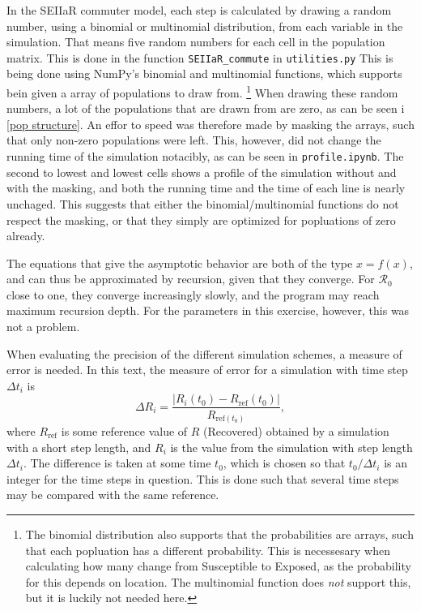 \documentclass{article}
\begin{document}
    In the SEIIaR commuter model, each step is calculated by drawing a random number, using a binomial or multinomial distribution, from each variable in the simulation.
    That means five random numbers for each cell in the population matrix.
    This is done in the function \verb|SEIIaR_commute| in \verb|utilities.py|
    This is being done using NumPy's binomial and multinomial functions, which supports bein given a array of populations to draw from.
    \footnote{The binomial distribution also supports that the probabilities are arrays, such that each popluation has a different probability.
    This is necessesary when calculating how many change from Susceptible to Exposed, as the probability for this depends on location.
    The multinomial function does \emph{not} support this, but it is luckily not needed here.}
    When drawing these random numbers, a lot of the populations that are drawn from are zero, as can be seen i \autoref{pop structure}.
    An effor to speed was therefore made by masking the arrays, such that only non-zero populations were left.
    This, however, did not change the running time of the simulation notacibly, as can be seen in \verb|profile.ipynb|.
    The second to lowest and lowest cells shows a profile of the simulation without and with the masking, and both the running time and the time of each line is nearly unchaged.
    This suggests that either the binomial/multinomial functions do not respect the masking, or that they simply are optimized for popluations of zero already.


    The equations that give the asymptotic behavior are both of the type $x = f(x)$, and can thus be approximated by recursion, given that they converge. 
    For $\mathcal{R}_0$ close to one, they converge increasingly slowly, and the program may reach maximum recursion depth. 
    For the parameters in this exercise, however, this was not a problem.

    When evaluating the precision of the different simulation schemes, a measure of error is needed.
    In this text, the measure of error for a simulation with time step $\Delta t_i$ is
    \begin{equation*}
        \Delta R_i = \frac{|R_i(t_0) - R_{\mathrm{ref}}(t_0)|}{R_{\mathrm{ref}(t_0)}},
    \end{equation*}
    where $R_{\mathrm{ref}}$ is some reference value of $R$ (Recovered) obtained by a simulation with a short step length, and $R_i$ is the value from the simulation with step length $\Delta t_i$.
    The difference is taken at some time $t_0$, which is chosen so that $t_0/\Delta t_i$ is an integer for the time steps in question.
    This is done such that several time steps may be compared with the same reference.
\end{document}
